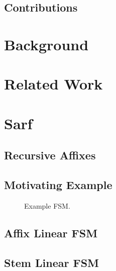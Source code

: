\documentclass[11pt,letterpaper]{article}
\begin{document}
\subsection{Contributions}




\section{Background}

\section{Related Work }

\section{Sarf}

\subsection{Recursive Affixes}

\subsection{Motivating Example}

\begin{figure}[t!]
\begin{center}
\resizebox{2\columnwidth}{!}{ }
\caption{Example FSM.}
\end{center}
\label{f:examples}
\end{figure}
%



\subsection{Affix Linear FSM}

\subsection{Stem Linear FSM}
\end{document}

